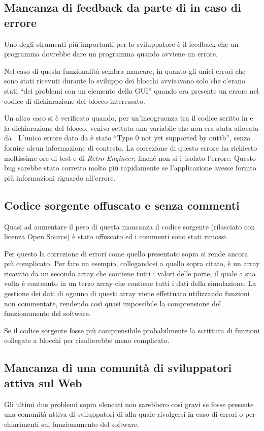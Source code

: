 \subsection{Mancanza di feedback da parte di \SciCos{} in caso di errore}
Uno degli strumenti più importanti per lo sviluppatore è il feedback che un
programma dovrebbe dare un programma quando avviene un errore.

Nel caso di \SciCosLab{} questa funzionalità sembra mancare, in quanto gli
unici errori che sono stati ricevuti durante lo sviluppo dei blocchi
avvisavano solo che c'erano stati ``dei problemi con un elemento della
GUI'' quando era presente un errore nel codice di dichiarazione del blocco
interessato.

Un altro caso si è verificato quando, per un'incogruenza tra
il codice scritto in  e la dichiarazione del blocco, veniva
settata una variabile che non era stata allocata da \SciCos{}. L'unico
errore dato da \SciCos{} è stato ``Type $0$ not yet supported by outtb'',
senza fornire alcun informazione di contesto. La correzione di questo
errore ha richiesto moltissime ore di test e di \emph{Retro-Engineer},
finchè non si è isolato l'errore. Questo bug sarebbe stato corretto molto
più rapidamente se l'applicazione avesse fornito più informazioni riguardo
all'errore.

\subsection{Codice sorgente offuscato e senza commenti}
Quasi ad aumentare il peso di questa mancanza il codice sorgente
(rilasciato con licenza Open Source) è stato offuscato ed i commenti sono
stati rimossi.

Per questo la correzione di errori come quello presentato sopra si rende
ancora più complicato. Per fare un esempio, collegandosi a quello sopra
citato,  è un array ricavato da un secondo array che contiene
tutti i valori delle porte, il quale a sua volta è contenuto in un terzo
array che contiene tutti i dati della simulazione. La gestione dei dati di
ognuno di questi array viene effettuato utilizzando funzioni non
commentate, rendendo così quasi impossibile la comprensione del
funzionamento del software.

Se il codice sorgente fosse più comprensibile probabilmente la scrittura di
funzioni collegate a blocchi per \SciCos{} risulterebbe meno complicato.

\subsection{Mancanza di una comunità di sviluppatori attiva sul Web}
Gli ultimi due problemi sopra elencati non sarebbero così gravi se fosse
presente una comunità attiva di sviluppatori di \SciCos{} alla quale
rivolgersi in caso di errori o per chiarimenti sul funzionamento del
software.

